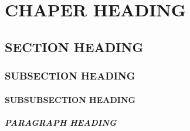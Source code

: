 
\chapter{CHAPER HEADING}
\label{chp:introduction}

\section{SECTION HEADING}

\subsection{SUBSECTION HEADING}

\subsubsection{SUBSUBSECTION HEADING}

\paragraph{PARAGRAPH HEADING}